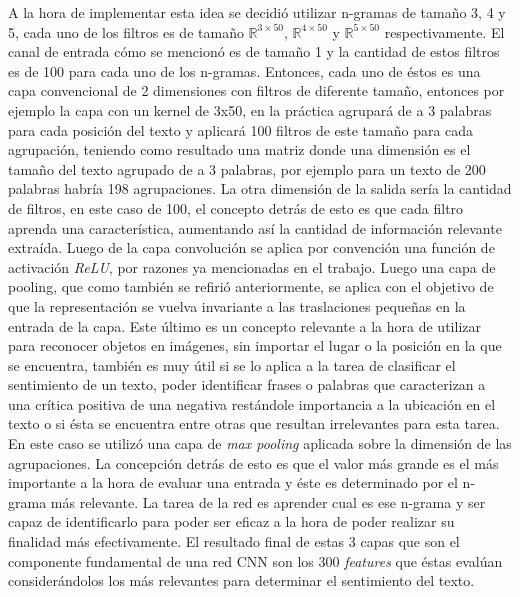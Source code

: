 \documentclass[spanish]{article}
\theoremstyle{definition}
\theoremstyle{remark}
\numberwithin{equation}{section}
\numberwithin{equation}{section} %
\begin{document}
\par
A la hora de implementar esta idea se decidió utilizar n-gramas de tamaño 3, 4 y 5, cada uno de los filtros es de tamaño $\mathbb{R}^{3 \times 50}$, $\mathbb{R}^{4 \times 50}$ y $\mathbb{R}^{5 \times 50}$ respectivamente. El canal de entrada cómo se mencionó es de tamaño 1 y la cantidad de estos filtros es de 100 para cada uno de los n-gramas. Entonces, cada uno de éstos es una capa convencional de 2 dimensiones con filtros de diferente tamaño, entonces por ejemplo la capa con un kernel de 3x50, en la práctica agrupará de a 3 palabras para cada posición del texto y aplicará 100 filtros de este tamaño para cada agrupación, teniendo como resultado una matriz donde una dimensión es el tamaño del texto agrupado de a 3 palabras, por ejemplo para un texto de 200 palabras habría 198 agrupaciones. La otra dimensión de la salida sería la cantidad de filtros, en este caso de 100, el concepto detrás de esto es que cada filtro aprenda una característica, aumentando así la cantidad de información relevante extraída. Luego de la capa convolución se aplica por convención una función de activación \textit{ReLU}, por razones ya mencionadas en el trabajo. Luego una capa de pooling, que como también se refirió anteriormente, se aplica con el objetivo de que la representación se vuelva invariante a las traslaciones pequeñas en la entrada de la capa. Este último es un concepto relevante a la hora de utilizar para reconocer objetos en imágenes, sin importar el lugar o la posición en la que se encuentra, también es muy útil si se lo aplica a la tarea de clasificar el sentimiento de un texto, poder identificar frases o palabras que caracterizan a una crítica positiva de una negativa restándole importancia a la ubicación en el texto o si ésta se encuentra entre otras que resultan irrelevantes para esta tarea. En este caso se utilizó una capa de \textit{max pooling} aplicada sobre la dimensión de las agrupaciones. La concepción detrás de esto es que el valor más grande es el más importante a la hora de evaluar una entrada y éste es determinado por el n-grama más relevante. La tarea de la red es aprender cual es ese n-grama y ser capaz de identificarlo para poder ser eficaz a la hora de poder realizar su finalidad más efectivamente. El resultado final de estas 3 capas que son el componente fundamental de una red CNN son los 300 \textit{features} que éstas evalúan considerándolos los más relevantes para determinar el sentimiento del texto.     
\par
\end{document}
